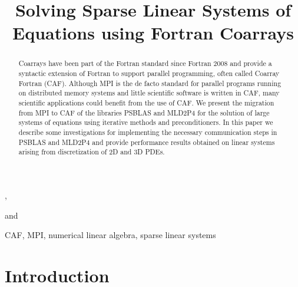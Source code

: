 \documentclass{IOS-Book-Article}
\def\hb{\hbox to 10.7 cm{}}
\begin{document}
\pagestyle{headings}
\def\thepage{}

\begin{frontmatter}              %


\title{Solving Sparse Linear Systems of Equations using Fortran Coarrays}


\author[A]{ %
},
\author[A]{ }
and
\author[B]{ }

\address[A]{University of Rome Tor Vergata}
\address[B]{Cranfield University}

\begin{abstract}
Coarrays have been part of the Fortran standard since
Fortran 2008 and provide a syntactic extension of Fortran to
support parallel programming, often called Coarray Fortran (CAF). 
Although MPI is the de facto standard for parallel programs running on
distributed memory systems and little  scientific software is  written in
CAF, many scientific applications could benefit from the use of CAF.  
We present the migration from MPI to CAF of the libraries PSBLAS  and
MLD2P4 for the solution of large systems of equations using iterative
methods and preconditioners.  
In this paper we describe some investigations for implementing the
necessary communication steps in PSBLAS and MLD2P4 and provide
performance results obtained on linear systems arising from
discretization of 2D and 3D PDEs.    
\end{abstract}

\begin{keyword}
CAF, MPI, numerical linear algebra, sparse linear systems
\end{keyword}
\end{frontmatter}



\section{Introduction}
\end{document}
